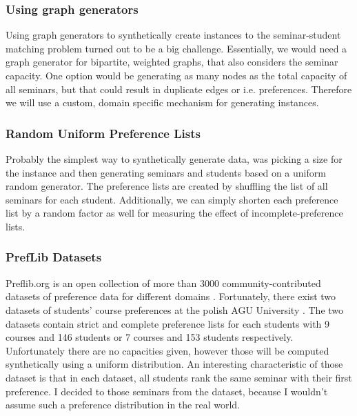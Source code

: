 \subsubsection{Using graph generators}
Using graph generators to synthetically create instances to the seminar-student matching problem turned out to be a big challenge. Essentially, we would need a graph generator for bipartite, weighted graphs, that also considers the seminar capacity. One option would be generating as many nodes as the total capacity of all seminars, but that could result in duplicate edges or i.e. preferences. Therefore we will use a custom, domain specific mechanism for generating instances.

\subsubsection{Random Uniform Preference Lists}
Probably the simplest way to synthetically generate data, was picking a size for the instance and then generating seminars and students based on a uniform random generator. The preference lists are created by shuffling the list of all seminars for each student. Additionally, we can simply shorten each preference list by a random factor as well for measuring the effect of incomplete-preference lists.

\subsubsection{PrefLib Datasets}
Preflib.org is an open collection of more than 3000 community-contributed datasets of preference data for different domains \cite{PrefLib}. Fortunately, there exist two datasets of students' course preferences at the polish AGU University \cite{preflib-dataset}. The two datasets contain strict and complete preference lists for each students with 9 courses and 146 students or 7 courses and 153 students respectively. Unfortunately there are no capacities given, however those will be computed synthetically using a uniform distribution. An interesting characteristic of those dataset is that in each dataset, all students rank the same seminar with their first preference. I decided to those seminars from the dataset, because I wouldn't assume such a preference distribution in the real world.

